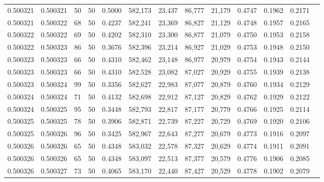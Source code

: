 \begin{tabular}{rrrrrrrrrrrrr}
0.500321 & 0.500321 &    50 &  50 &                                     0.5000 & 582,173 &  23,437 &  86,777 &  21,179 & 0.4747 & 0.1962 & 0.2171 \\
0.500321 & 0.500322 &    68 &  50 &                                     0.4237 & 582,241 &  23,369 &  86,827 &  21,129 & 0.4748 & 0.1957 & 0.2165 \\
0.500322 & 0.500322 &    69 &  50 &                                     0.4202 & 582,310 &  23,300 &  86,877 &  21,079 & 0.4750 & 0.1953 & 0.2158 \\
0.500322 & 0.500323 &    86 &  50 &                                     0.3676 & 582,396 &  23,214 &  86,927 &  21,029 & 0.4753 & 0.1948 & 0.2150 \\
0.500323 & 0.500323 &    66 &  50 &                                     0.4310 & 582,462 &  23,148 &  86,977 &  20,979 & 0.4754 & 0.1943 & 0.2144 \\
0.500323 & 0.500323 &    66 &  50 &                                     0.4310 & 582,528 &  23,082 &  87,027 &  20,929 & 0.4755 & 0.1939 & 0.2138 \\
0.500323 & 0.500324 &    99 &  50 &                                     0.3356 & 582,627 &  22,983 &  87,077 &  20,879 & 0.4760 & 0.1934 & 0.2129 \\
0.500324 & 0.500324 &    71 &  50 &                                     0.4132 & 582,698 &  22,912 &  87,127 &  20,829 & 0.4762 & 0.1929 & 0.2122 \\
0.500324 & 0.500325 &    95 &  50 &                                     0.3448 & 582,793 &  22,817 &  87,177 &  20,779 & 0.4766 & 0.1925 & 0.2114 \\
0.500325 & 0.500325 &    78 &  50 &                                     0.3906 & 582,871 &  22,739 &  87,227 &  20,729 & 0.4769 & 0.1920 & 0.2106 \\
0.500325 & 0.500326 &    96 &  50 &                                     0.3425 & 582,967 &  22,643 &  87,277 &  20,679 & 0.4773 & 0.1916 & 0.2097 \\
0.500326 & 0.500326 &    65 &  50 &                                     0.4348 & 583,032 &  22,578 &  87,327 &  20,629 & 0.4774 & 0.1911 & 0.2091 \\
0.500326 & 0.500326 &    65 &  50 &                                     0.4348 & 583,097 &  22,513 &  87,377 &  20,579 & 0.4776 & 0.1906 & 0.2085 \\
0.500326 & 0.500327 &    73 &  50 &                                     0.4065 & 583,170 &  22,440 &  87,427 &  20,529 & 0.4778 & 0.1902 & 0.2079 \\

\end{tabular}
